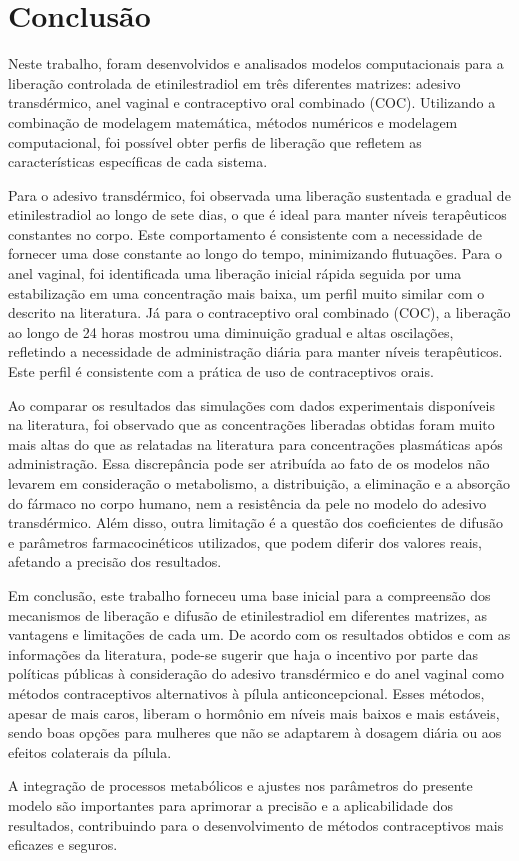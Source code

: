 \chapter{Conclusão}\label{chp:conclusao}

Neste trabalho, foram desenvolvidos e analisados modelos computacionais para a liberação controlada de etinilestradiol em três diferentes matrizes: adesivo transdérmico, anel vaginal e contraceptivo oral combinado (COC). Utilizando a combinação de modelagem matemática, métodos numéricos e modelagem computacional, foi possível obter perfis de liberação que refletem as características específicas de cada sistema.

Para o adesivo transdérmico, foi observada uma liberação sustentada e gradual de etinilestradiol ao longo de sete dias, o que é ideal para manter níveis terapêuticos constantes no corpo. Este comportamento é consistente com a necessidade de fornecer uma dose constante ao longo do tempo, minimizando flutuações. Para o anel vaginal, foi identificada uma liberação inicial rápida seguida por uma estabilização em uma concentração mais baixa, um perfil muito similar com o descrito na literatura. Já para o contraceptivo oral combinado (COC), a liberação ao longo de 24 horas mostrou uma diminuição gradual e altas oscilações, refletindo a necessidade de administração diária para manter níveis terapêuticos. Este perfil é consistente com a prática de uso de contraceptivos orais.

Ao comparar os resultados das simulações com dados experimentais disponíveis na literatura, foi observado que as concentrações liberadas obtidas foram muito mais altas do que as relatadas na literatura para concentrações plasmáticas após administração. Essa discrepância pode ser atribuída ao fato de os modelos não levarem em consideração o metabolismo, a distribuição, a eliminação e a absorção do fármaco no corpo humano, nem a resistência da pele no modelo do adesivo transdérmico. Além disso, outra limitação é a questão dos coeficientes de difusão e parâmetros farmacocinéticos utilizados, que podem diferir dos valores reais, afetando a precisão dos resultados.

Em conclusão, este trabalho forneceu uma base inicial para a compreensão dos mecanismos de liberação e difusão de etinilestradiol em diferentes matrizes, as vantagens e limitações de cada um. De acordo com os resultados obtidos e com as informações da literatura, pode-se sugerir que haja o incentivo por parte das políticas públicas à consideração do adesivo transdérmico e do anel vaginal como métodos contraceptivos alternativos à pílula anticoncepcional. Esses métodos, apesar de mais caros, liberam o hormônio em níveis mais baixos e mais estáveis, sendo boas opções para mulheres que não se adaptarem à dosagem diária ou aos efeitos colaterais da pílula. 

A integração de processos metabólicos e ajustes nos parâmetros do presente modelo são importantes para aprimorar a precisão e a aplicabilidade dos resultados, contribuindo para o desenvolvimento de métodos contraceptivos mais eficazes e seguros.
